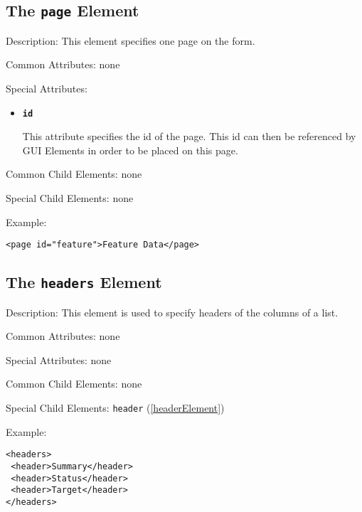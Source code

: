 \subsection{ The \texttt{page} Element}
\label{pageelement}
\begin{description}
 \item Description: This element specifies one page on the form.

 \item Common Attributes: none

 \item Special Attributes: 

\begin{itemize}
 \item \textbf{\texttt{id}}

This attribute specifies the id of the page. This id can then be referenced by GUI Elements in order to be placed on this page.
\end{itemize}


 \item Common Child Elements: none

 \item Special Child Elements: none

 \item Example: 

\begin{lstlisting}[caption=\texttt{page} Element]
<page id="feature">Feature Data</page>
\end{lstlisting}
\end{description}









\subsection{ The \texttt{headers} Element}
\label{headersElement}
\begin{description}
 \item Description: This element is used to specify headers of the columns of a list.

 \item Common Attributes: none

 \item Special Attributes: none

 \item Common Child Elements: none

 \item Special Child Elements: \texttt{header} (\ref{headerElement})

 \item Example: 

\begin{lstlisting}[caption=\texttt{headers} Element]
<headers>
 <header>Summary</header>
 <header>Status</header>
 <header>Target</header>
</headers>
\end{lstlisting}
\end{description}




